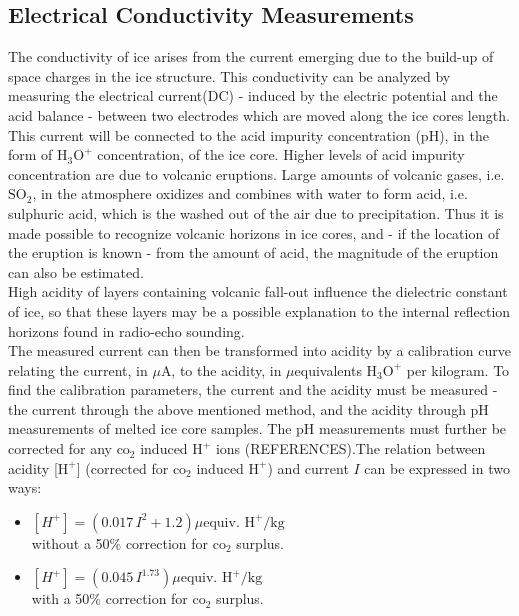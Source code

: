 \documentclass[../../CompleteThesis2/Complete_2ndDraft]{subfiles}
\begin{document}
\subsection[ECM][ECM]{Electrical Conductivity Measurements}
\label{Sec:Ice_ECMandDEP_ECM}
The conductivity of ice arises from the current emerging due to the build-up of space charges in the ice structure. This conductivity can be analyzed by measuring the electrical current(DC) - induced by the electric potential and the acid balance - between two electrodes which are moved along the ice cores length. This current will be connected to the acid impurity concentration (pH), in the form of $\text{H}_3\text{O}^+$ concentration, of the ice core. Higher levels of acid impurity concentration are due to volcanic eruptions. Large amounts of volcanic gases, i.e. $\text{SO}_2$, in the atmosphere oxidizes and combines with water to form acid, i.e. sulphuric acid, which is the washed out of the air due to precipitation. Thus it is made possible to recognize volcanic horizons in ice cores, and - if the location of the eruption is known - from the amount of acid, the magnitude of the eruption can also be estimated.\\
High acidity of layers containing volcanic fall-out influence the dielectric constant of ice, so that these layers may be a possible explanation to the internal reflection horizons found in radio-echo sounding. \\
The measured current can then be transformed into acidity by a calibration curve relating the current, in $\mu$A, to the acidity, in $\mu$equivalents $\text{H}_3\text{O}^+$ per kilogram. To find the calibration parameters, the current and the acidity must be measured - the current through the above mentioned method, and the acidity through pH measurements of melted ice core samples. The pH measurements must further be corrected for any $\text{co}_2$ induced $\text{H}^+$ ions (REFERENCES).The relation between acidity [$\text{H}^+$] (corrected for $\text{co}_2$ induced $\text{H}^+$) and current $I$ can be expressed in two ways:
\begin{itemize}
	\item $[H^+] = (0.017\, I^2 + 1.2) \mu \text{equiv. H}^+ /\text{kg}$\\
	without a 50\% correction for $\text{co}_2$ surplus.
	\item $[H^+] = (0.045\, I^{1.73}) \mu \text{equiv. H}^+ /\text{kg}$\\
	with a 50\% correction for $\text{co}_2$ surplus.
\end{itemize}
\end{document}
